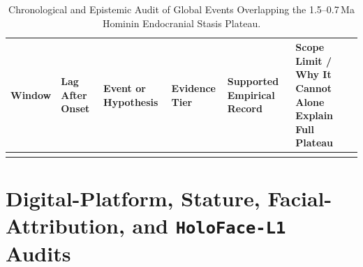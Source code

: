 \begin{table}[!t]
\caption{Chronological and Epistemic Audit of Global Events Overlapping the 1.5--0.7\,Ma Hominin Endocranial Stasis Plateau.}\label{tab:plateau_events}
\scriptsize
\setlength{\tabcolsep}{3.8pt}
\begin{tabularx}{\textwidth}{@{}ll>{\raggedright\arraybackslash}p{}>{\raggedright\arraybackslash}p{}LL@{}}
\toprule
Window & Lag After Onset & Event or Hypothesis & Evidence Tier & Supported Empirical Record & Scope Limit / Why It Cannot Alone Explain Full Plateau \\
\midrule
{}
\bottomrule
\end{tabularx}
\end{table}

\setcounter{table}{0}
\renewcommand{\thetable}{C\arabic{table}}
\renewcommand{\theHtable}{AppC.tab.\arabic{table}}

\section{Digital-Platform, Stature, Facial-Attribution, and \texorpdfstring{\texttt{HoloFace-L1}}{HoloFace-L1} Audits}\label{app:platforms}

